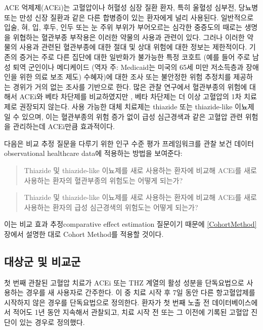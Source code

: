 \documentclass[10.5pt]{book}
\theoremstyle{definition}
\theoremstyle{definition}
\theoremstyle{definition}
\theoremstyle{remark}
\begin{document}
ACE 억제제(ACEi)는 고혈압이나 허혈성 심장 질환 환자, 특히 울혈성 심부전,
당뇨병 또는 만성 신장 질환과 같은 다른 합병증이 있는 환자에게 널리
사용된다. \citep{zaman_2002} 일반적으로 입술, 혀, 입, 후두, 인두 또는 눈
주위 부위가 부어오르는 심각한 중증도의 때로는 생명을 위협하는 혈관부종
부작용은 이러한 약물의 사용과 관련이 있다. \citep{sabroe_1997} 그러나
이러한 약물의 사용과 관련된 혈관부종에 대한 절대 및 상대 위험에 대한
정보는 제한적이다. 기존의 증거는 주로 다른 집단에 대한 일반화가 불가능한
특정 코호트 (예를 들어 주로 남성 퇴역 군인이나 메디케이드 (역자 주:
Medicaid는 미국의 65세 미만 저소득층과 장애인을 위한 의료 보조 제도)
수혜자)에 대한 조사 또는 불안정한 위험 추정치를 제공하는 경위가 거의
없는 조사를 기반으로 한다. \citep{powers_2012} 많은 관찰 연구에서
혈관부종의 위험에 대해서 ACEi와 베타 차단제를 비교하였지만
\citep{magid_2010, toh_2012}, 베타 차단제는 더 이상 고혈압의 1차
치료제로 권장되지 않는다. \citep{whelton_2018} 사용 가능한 대체 치료제는
thiazide 또는 thiazide-like 이뇨제일 수 있으며, 이는 혈관부종의 위험
증가 없이 급성 심근경색과 같은 고혈압 관련 위험을 관리하는데 ACEi만큼
효과적이다.

다음은 비교 추정 질문을 다루기 위한 인구 수준 평가 프레임워크를 관찰
보건 데이터observational healthcare data에 적용하는 방법을 보여준다:

\begin{quote}
Thiazide 및 thiazide-like 이뇨제를 새로 사용하는 환자에 비교해 ACEi를
새로 사용하는 환자의 혈관부종의 위험도는 어떻게 되는가?
\end{quote}

\begin{quote}
Thiazide 및 thiazide-like 이뇨제를 새로 사용하는 환자에 비교해 ACEi를
새로 사용하는 환자의 급성 심근경색의 위험도는 어떻게 되는가?
\end{quote}

이는 비교 효과 추정comparative effect estimation 질문이기 때문에
\ref{CohortMethod}장에서 설명한 대로 Cohort Method를 적용할 것이다.

\subsection{대상군 및 비교군}\label{--}

첫 번째 관찰된 고혈압 치료가 ACEi 또는 THZ 계열의 활성 성분을
단독요법으로 사용하는 경우를 새 사용자로 간주한다. 이 중 치료 시작 후
7일 동안 다른 항고혈압제를 시작하지 않은 경우를 단독요법으로 정의한다.
환자가 첫 번째 노출 전 데이터베이스에서 적어도 1년 동안 지속해서
관찰되고, 치료 시작 전 또는 그 이전에 기록된 고혈압 진단이 있는 경우로
정의했다.
\end{document}
